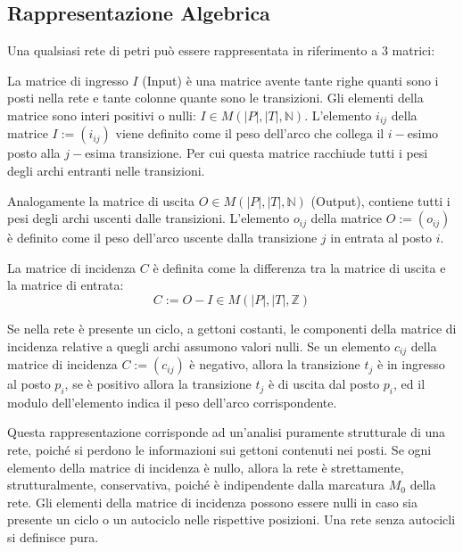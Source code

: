 \documentclass{article}
\numberwithin{equation}{subsection}
\begin{document}
\subsection{Rappresentazione Algebrica}

Una qualsiasi rete di petri può essere rappresentata in riferimento a $3$ matrici:


La matrice di ingresso $I$ (Input) è una matrice avente tante righe quanti sono i posti nella rete e tante colonne quante sono le transizioni. Gli elementi della matrice 
sono interi positivi o nulli: $I\in M(|P|,|T|,\mathbb{N})$. L'elemento $i_{ij}$ della matrice $I:=(i_{ij})$ viene definito come il peso dell'arco che collega il $i-$esimo posto 
alla $j-$esima transizione. Per cui questa matrice racchiude tutti i pesi degli archi entranti nelle transizioni. 

Analogamente la matrice di uscita $O\in M(|P|,|T|,\mathbb{N})$ (Output), contiene tutti i pesi degli archi uscenti dalle transizioni. L'elemento $o_{ij}$ della matrice $O:=(o_{ij})$ 
è definito come il peso dell'arco uscente dalla transizione $j$ in entrata al posto $i$. 


La matrice di incidenza $C$ è definita come la differenza tra la matrice di uscita e la matrice di entrata:
\begin{equation}
    C:=O-I\in M(|P|,|T|,\mathbb{Z})
\end{equation}

Se nella rete è presente un ciclo, a gettoni costanti, le componenti della matrice di incidenza relative a quegli archi assumono valori nulli. Se un elemento $c_{ij}$ della 
matrice di incidenza $C:=(c_{ij})$ è negativo, allora la transizione $t_j$ è in ingresso al posto $p_i$, se è positivo allora la transizione $t_j$ è di uscita dal posto $p_i$, 
ed il modulo dell'elemento indica il peso dell'arco corrispondente. 


Questa rappresentazione corrisponde ad un'analisi puramente strutturale di una rete, poiché si perdono le informazioni sui gettoni contenuti nei posti. Se ogni elemento 
della matrice di incidenza è nullo, allora la rete è strettamente, strutturalmente, conservativa, poiché è indipendente dalla marcatura $M_0$ della rete. Gli elementi della 
matrice di incidenza possono essere nulli in caso sia presente un ciclo o un autociclo nelle rispettive posizioni. Una rete senza autocicli si definisce pura. 
\end{document}
